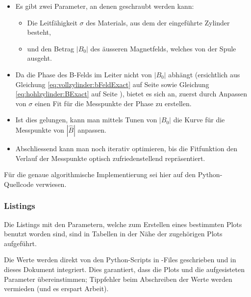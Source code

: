 \begin{itemize}
    \item
        Es gibt zwei Parameter, an denen geschraubt werden kann:
        \begin{itemize}
            \item
                Die  Leitf\"ahigkeit  $\sigma$  des  Materials,  aus  dem  der
                eingef\"uhrte Zylinder besteht,
            \item
                und den Betrag $|B_0|$ des \"ausseren Magnetfelds, welches von
                der Spule ausgeht.
        \end{itemize}
    \item
        Da   die   Phase   des   B-Felds   im   Leiter   nicht   von   $|B_0|$
        abh\"angt (ersichtlich  aus Gleichung \ref{eq:vollzylinder:bFeldExact}
        auf       Seite       \pageref{eq:vollzylinder:bFeldExact}       sowie
        Gleichung        \ref{eq:hohlzylinder:BExact}         auf        Seite
        \pageref{eq:hohlzylinder:BExact}),  bietet es  sich  an, zuerst  durch
        Anpassen  von $\sigma$  einen Fit  f\"ur die  Messpunkte der  Phase zu
        erstellen.
    \item
        Ist dies gelungen, kann man mittels  Tunen von $|B_0|$ die Kurve f\"ur
        die Messpunkte von $|\hat{B}|$ anpassen.
    \item
        Abschliessend kann  man noch iterativ optimieren,  bis die Fitfunktion
        den Verlauf der Messpunkte optisch zufriedenstellend repr\"asentiert.
\end{itemize}


F\"ur   die   genaue  algorithmische   Implementierung   sei   hier  auf   den
Python-Quellcode verwiesen. %


\subsubsection{Listings}
\label{sec:ausw:subsec:methodik:subsubsec:listings}

Die Listings mit  den Parametern, welche zum Erstellen  eines bestimmten Plots
benutzt worden  sind, sind in Tabellen  in der N\"ahe der  zugeh\"origen Plots
aufgef\"uhrt.

Die  Werte   werden  direkt  von  den   Python-Scripts  in  -Files
geschrieben und in dieses Dokument integriert. Dies garantiert, dass die Plots
und die aufgesisteten Parameter  \"ubereinstimmen; Tippfehler beim Abschreiben
der Werte werden vermieden (und es erspart Arbeit).

